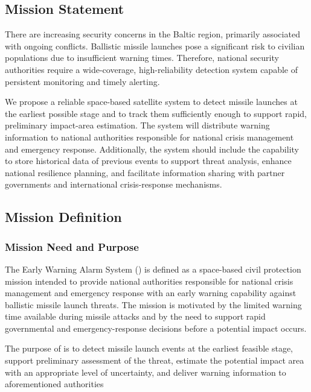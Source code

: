 \subsection{Mission Statement}

There are increasing security concerns in the Baltic region, primarily associated with ongoing conflicts. Ballistic missile launches pose a significant risk to civilian populations due to insufficient warning times. Therefore, national security authorities require a wide-coverage, high-reliability detection system capable of persistent monitoring and timely alerting.

We propose a reliable space-based satellite system to detect missile launches at the earliest possible stage and to track them sufficiently enough to support rapid, preliminary impact-area estimation. The system will distribute warning information to national authorities responsible for national crisis management and emergency response. Additionally, the system should include the capability to store historical data of previous events to support threat analysis, enhance national resilience planning, and facilitate information sharing with partner governments and international crisis-response mechanisms.

\subsection{Mission Definition}

\subsubsection{Mission Need and Purpose}

The Early Warning Alarm System () is defined as a space-based civil protection mission intended to provide national authorities responsible for national crisis management and emergency response with an early warning capability against ballistic missile launch threats. The mission is motivated by the limited warning time available during missile attacks and by the need to support rapid governmental and emergency-response decisions before a potential impact occurs.

The purpose of  is to detect missile launch events at the earliest feasible stage, support preliminary assessment of the threat, estimate the potential impact area with an appropriate level of uncertainty, and deliver warning information to aforementioned authorities

